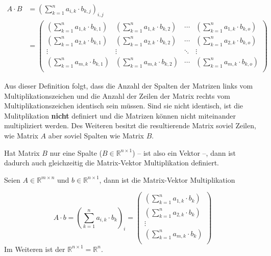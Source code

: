 \begin{equation*}
\begin{split}
A \cdot B & = \left( \sum_{k=1}^{n} a_{i,k} \cdot b_{k,j} \right)_{i,j} \\
 &= \begin{pmatrix}
\left( \sum_{k=1}^{n} a_{1,k} \cdot b_{k,1} \right) & \left( \sum_{k=1}^{n} a_{1,k} \cdot b_{k,2} \right) & \cdots & \left( \sum_{k=1}^{n} a_{1,k} \cdot b_{k,o} \right) \\
\left( \sum_{k=1}^{n} a_{2,k} \cdot b_{k,1} \right) & \left( \sum_{k=1}^{n} a_{2,k} \cdot b_{k,2} \right) & \cdots & \left( \sum_{k=1}^{n} a_{2,k} \cdot b_{k,o} \right) \\
\vdots & \vdots & \ddots & \vdots \\
\left( \sum_{k=1}^{n} a_{m,k} \cdot b_{k,1} \right) & \left( \sum_{k=1}^{n} a_{m,k} \cdot b_{k,2} \right) & \cdots & \left( \sum_{k=1}^{n} a_{m,k} \cdot b_{k,o} \right) \\
\end{pmatrix}
\end{split}
\end{equation*}

Aus dieser Definition folgt, dass die Anzahl der Spalten der Matrizen links vom Multiplikationszeichen und die Anzahl der Zeilen der Matrix rechts vom Multiplikationszeichen identisch sein müssen. Sind sie nicht identisch, ist die Mulitplikation \textbf{nicht} definiert und die Matrizen können nicht miteinander multipliziert werden. Des Weiteren besitzt die resultierende Matrix soviel Zeilen, wie Matrix $A$ aber soviel Spalten wie Matrix $B$.

\begin{svgraybox}
Hat Matrix $B$ nur eine Spalte ($B\in \mathbb{R}^{n\times 1}$) -- ist also ein Vektor --, dann ist dadurch auch gleichzeitig die Matrix-Vektor Multiplikation definiert. 
\end{svgraybox}

Seien $A\in \mathbb{R}^{m\times n}$ und $b\in \mathbb{R}^{n\times 1}$, dann ist die Matrix-Vektor Multiplikation

\begin{equation*}
A \cdot b = \left( \sum_{k=1}^{n} a_{i,k} \cdot b_{k} \right)_{i} = \begin{pmatrix}
\left( \sum_{k=1}^{n} a_{1,k} \cdot b_{k} \right) \\
\left( \sum_{k=1}^{n} a_{2,k} \cdot b_{k} \right) \\
\vdots \\
\left( \sum_{k=1}^{n} a_{m,k} \cdot b_{k} \right) \\
\end{pmatrix}
\end{equation*}
Im Weiteren ist der $\mathbb{R}^{n\times 1} = \mathbb{R}^n$.


